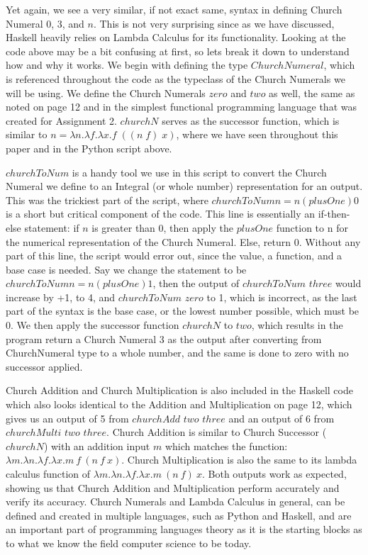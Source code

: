 \documentclass{article}
\begin{document}
\noindent
Yet again, we see a very similar, if not exact same, syntax in defining Church Numeral 0, 3, and $n$. This is not very surprising since as we have discussed, Haskell heavily relies on Lambda Calculus for its functionality. Looking at the code above may be a bit confusing at first, so lets break it down to understand how and why it works. We begin with defining the type $ChurchNumeral$, which is referenced throughout the code as the typeclass of the Church Numerals we will be using. We define the Church Numerals $zero$ and $two$ as well, the same as noted on page 12 and in the simplest functional programming language that was created for Assignment 2. $churchN$ serves as the successor function, which is similar to $ n = \lambda n. \lambda f. \lambda x.f \; ((n \; f) \; x)$, where we have seen throughout this paper and in the Python script above.

\medskip\noindent
$churchToNum$ is a handy tool we use in this script to convert the Church Numeral we define to an Integral (or whole number) representation for an output. This was the trickiest part of the script, where $churchToNum n = n (plusOne) 0$ is a short but critical component of the code. This line is essentially an if-then-else statement: if $n$ is greater than 0, then apply the $plusOne$ function to n for the numerical representation of the Church Numeral. Else, return 0. Without any part of this line, the script would error out, since the value, a function, and a base case is needed. Say we change the statement to be $churchToNum n = n (plusOne) 1$, then the output of $churchToNum$ $three$ would increase by +1, to 4, and $churchToNum$ $zero$ to 1, which is incorrect, as the last part of the syntax is the base case, or the lowest number possible, which must be 0. We then apply the successor function $churchN$ to $two$, which results in the program return a Church Numeral 3 as the output after converting from ChurchNumeral type to a whole number, and the same is done to zero with no successor applied. 

\medskip\noindent
Church Addition and Church Multiplication is also included in the Haskell code which also looks identical to the Addition and Multiplication on page 12, which gives us an output of 5 from $churchAdd$ $two$ $three$ and an output of 6 from $churchMulti$ $two$ $three$. Church Addition is similar to Church Successor ($churchN$) with an addition input $m$ which matches the function: $\lambda m.\lambda n.\lambda f.\lambda x. m\ f\ (n\ f\ x)$. Church Multiplication is also the same to its lambda calculus function of $\lambda m.\lambda n.\lambda f.\lambda x.m\ (n\ f) \ x $. Both outputs work as expected, showing us that Church Addition and Multiplication perform accurately and verify its accuracy. Church Numerals and Lambda Calculus in general, can be defined and created in multiple languages, such as Python and Haskell, and are an important part of programming languages theory as it is the starting blocks as to what we know the field computer science to be today.
\end{document}
